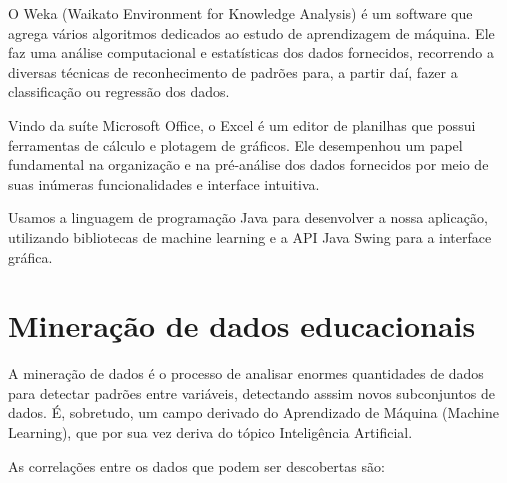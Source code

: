 \documentclass[12pt]{article}
\begin{document}
\begin{description}[font=$\bullet$~\normalfont\scshape\color{black!50!black}]

\item[weka] O Weka (Waikato Environment for Knowledge Analysis) é um software que agrega vários algoritmos dedicados ao estudo de aprendizagem de máquina. Ele faz uma análise computacional e estatísticas dos dados fornecidos, recorrendo a diversas técnicas de reconhecimento de padrões para, a partir daí, fazer a classificação ou regressão dos dados.
\\
\item[excel] Vindo da suíte Microsoft Office, o Excel é um editor de planilhas que possui ferramentas de cálculo e plotagem de gráficos. Ele desempenhou um papel fundamental na organização e na pré-análise dos dados fornecidos por meio de suas inúmeras funcionalidades e interface intuitiva.
\\
\item[java] Usamos a linguagem de programação Java para desenvolver a nossa aplicação, utilizando bibliotecas de machine learning e a API Java Swing para a interface gráfica.

\end{description}

\section{Mineração de dados educacionais} 
A mineração de dados é o processo de analisar enormes quantidades de dados para detectar padrões entre variáveis, detectando asssim novos subconjuntos de dados. É, sobretudo, um campo derivado do Aprendizado de Máquina (Machine Learning), que por sua vez deriva do tópico Inteligência Artificial.

As correlações entre os dados que podem ser descobertas são:
\end{document}
